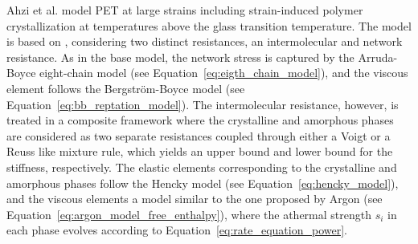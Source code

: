 
Ahzi et al. \citep{ahziModelingDeformationBehavior2003} model PET at large strains including strain-induced polymer crystallization at temperatures above the glass transition temperature.
The model is based on \citep{boyceConstitutiveModelFinite2000}, considering two distinct resistances, an intermolecular and network resistance.
As in the base model, the network stress is captured by the Arruda-Boyce eight-chain model (see Equation~\eqref{eq:eigth_chain_model}), and the viscous element follows the Bergström-Boyce model (see Equation~\eqref{eq:bb_reptation_model}).
The intermolecular resistance, however, is treated in a composite framework where the crystalline and amorphous phases are considered as two separate resistances coupled through either a Voigt or a Reuss like mixture rule, which yields an upper bound and lower bound for the stiffness, respectively.
The elastic elements corresponding to the crystalline and amorphous phases follow the Hencky model (see Equation~\eqref{eq:hencky_model}), and the viscous elements a model similar to the one proposed by Argon (see Equation~\eqref{eq:argon_model_free_enthalpy}), where the athermal strength $s_i$ in each phase evolves according to Equation~\eqref{eq:rate_equation_power}.

